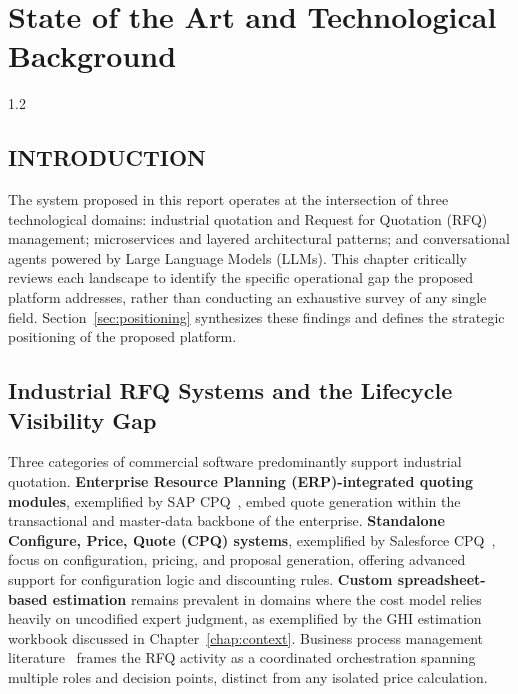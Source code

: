 \chapter[State of the Art]{State of the Art and Technological\\Background}\label{chap:soa}
\begin{spacing}{1.2}
\minitoc
\thispagestyle{MyStyle}
\end{spacing}
\newpage

\section*{INTRODUCTION}
The system proposed in this report operates at the intersection of three technological domains: industrial quotation and Request for Quotation (RFQ) management; microservices and layered architectural patterns; and conversational agents powered by Large Language Models (LLMs). This chapter critically reviews each landscape to identify the specific operational gap the proposed platform addresses, rather than conducting an exhaustive survey of any single field. Section~\ref{sec:positioning} synthesizes these findings and defines the strategic positioning of the proposed platform.

\section{Industrial RFQ Systems and the Lifecycle Visibility Gap}\label{sec:rfq_systems}
Three categories of commercial software predominantly support industrial quotation. \textbf{Enterprise Resource Planning (ERP)-integrated quoting modules}, exemplified by SAP CPQ~\cite{sap_cpq_product}, embed quote generation within the transactional and master-data backbone of the enterprise. \textbf{Standalone Configure, Price, Quote (CPQ) systems}, exemplified by Salesforce CPQ~\cite{salesforce_cpq_docs}, focus on configuration, pricing, and proposal generation, offering advanced support for configuration logic and discounting rules. \textbf{Custom spreadsheet-based estimation} remains prevalent in domains where the cost model relies heavily on uncodified expert judgment, as exemplified by the GHI estimation workbook discussed in Chapter~\ref{chap:context}. Business process management literature~\cite{dumas2018bpm} frames the RFQ activity as a coordinated orchestration spanning multiple roles and decision points, distinct from any isolated price calculation.


